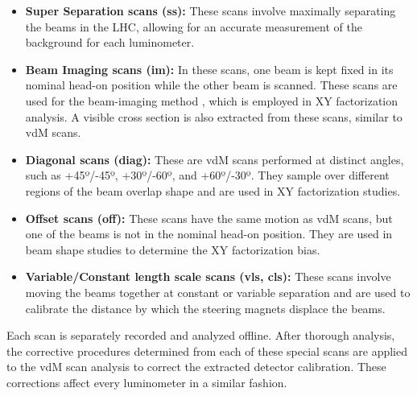 \begin{itemize}
    \item \textbf{Super Separation scans (ss):} These scans involve maximally separating the beams in the LHC, allowing for an accurate measurement of the background for each luminometer.
    \item \textbf{Beam Imaging scans (im):} In these scans, one beam is kept fixed in its nominal head-on position while the other beam is scanned. These scans are used for the beam-imaging method \cite{Klute_2017}, which is employed in XY factorization analysis. A visible cross section is also extracted from these scans, similar to vdM scans.
    \item \textbf{Diagonal scans (diag):} These are vdM scans performed at distinct angles, such as +45º/-45º, +30º/-60º, and +60º/-30º. They sample over different regions of the beam overlap shape and are used in XY factorization studies.
    \item \textbf{Offset scans (off):} These scans have the same motion as vdM scans, but one of the beams is not in the nominal head-on position. They are used in beam shape studies to determine the XY factorization bias.
    \item \textbf{Variable/Constant length scale scans (vls, cls):} These scans involve moving the beams together at constant or variable separation and are used to calibrate the distance by which the steering magnets displace the beams.
\end{itemize}

Each scan is separately recorded and analyzed offline. After thorough analysis, the corrective procedures determined from each of these special scans are applied to the vdM scan analysis to correct the extracted detector calibration. These corrections affect every luminometer in a similar fashion.
